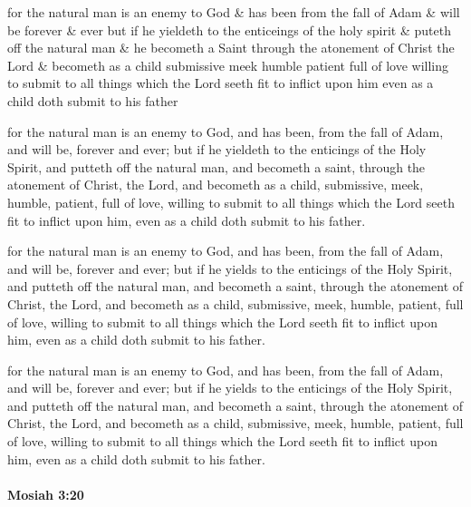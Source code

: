 			\begin{framed}
			\scriptsize
				\begin{compactdesc}
					\item[PM] for the natural man is an enemy to God \& has been from the fall of Adam \& will be forever \& ever but if he yieldeth to the enticeings of the holy spirit \& puteth off the natural man \& he becometh a Saint through the atonement of Christ the Lord \& becometh as a child submissive meek humble patient full of love willing to submit to all things which the Lord seeth fit to inflict upon him even as a child doth submit to his father
					\item[1830] for the natural man is an enemy to God, and has been, from the fall of Adam, and will be, forever and ever; but if he yieldeth to the enticings of the Holy Spirit, and putteth off the natural man, and becometh a saint, through the atonement of Christ, the Lord, and becometh as a child, submissive, meek, humble, patient, full of love, willing to submit to all things which the Lord seeth fit to inflict upon him, even as a child doth submit to his father.
					\item[1837] for the natural man is an enemy to God, and has been, from the fall of Adam, and will be, forever and ever; but if he yields to the enticings of the Holy Spirit, and putteth off the natural man, and becometh a saint, through the atonement of Christ, the Lord, and becometh as a child, submissive, meek, humble, patient, full of love, willing to submit to all things which the Lord seeth fit to inflict upon him, even as a child doth submit to his father.
					\item[1840] for the natural man is an enemy to God, and has been, from the fall of Adam, and will be, forever and ever; but if he yields to the enticings of the Holy Spirit, and putteth off the natural man, and becometh a saint, through the atonement of Christ, the Lord, and becometh as a child, submissive, meek, humble, patient, full of love, willing to submit to all things which the Lord seeth fit to inflict upon him, even as a child doth submit to his father.
				\end{compactdesc}
			\end{framed}

		\paragraph{Mosiah 3:20} %
			\label{MOSIAH-3-20}

